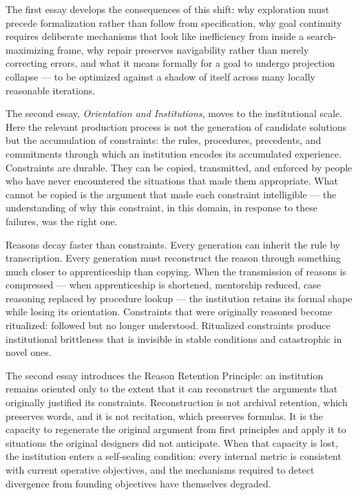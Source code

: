 The first essay develops the consequences of this shift: why exploration must
precede formalization rather than follow from specification, why goal continuity
requires deliberate mechanisms that look like inefficiency from inside a
search-maximizing frame, why repair preserves navigability rather than merely
correcting errors, and what it means formally for a goal to undergo projection
collapse --- to be optimized against a shadow of itself across many locally
reasonable iterations.

The second essay, \textit{Orientation and Institutions}, moves to the
institutional scale. Here the relevant production process is not the generation
of candidate solutions but the accumulation of constraints: the rules, procedures,
precedents, and commitments through which an institution encodes its accumulated
experience. Constraints are durable. They can be copied, transmitted, and
enforced by people who have never encountered the situations that made them
appropriate. What cannot be copied is the argument that made each constraint
intelligible --- the understanding of why this constraint, in this domain,
in response to these failures, was the right one.

Reasons decay faster than constraints. Every generation can inherit the rule
by transcription. Every generation must reconstruct the reason through something
much closer to apprenticeship than copying. When the transmission of reasons
is compressed --- when apprenticeship is shortened, mentorship reduced, case
reasoning replaced by procedure lookup --- the institution retains its formal
shape while losing its orientation. Constraints that were originally reasoned
become ritualized: followed but no longer understood. Ritualized constraints
produce institutional brittleness that is invisible in stable conditions and
catastrophic in novel ones.

The second essay introduces the Reason Retention Principle: an institution
remains oriented only to the extent that it can reconstruct the arguments
that originally justified its constraints. Reconstruction is not archival
retention, which preserves words, and it is not recitation, which preserves
formulas. It is the capacity to regenerate the original argument from
first principles and apply it to situations the original designers did not
anticipate. When that capacity is lost, the institution enters a self-sealing
condition: every internal metric is consistent with current operative
objectives, and the mechanisms required to detect divergence from founding
objectives have themselves degraded.

